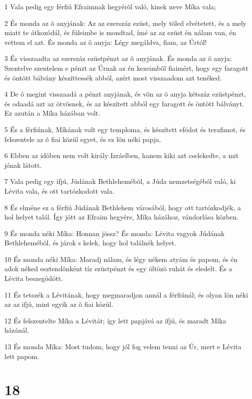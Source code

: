\par 1 Vala pedig egy férfiú Efraimnak hegyérõl való, kinek neve Míka vala;
\par 2 És monda az õ anyjának: Az az ezerszáz ezüst, mely tõled elvétetett, és a mely miatt te átkozódál, és füleimbe is mondtad, ímé az az ezüst én nálam van, én vettem el azt. És monda az õ anyja: Légy megáldva, fiam, az Úrtól!
\par 3 És visszaadta az ezerszáz ezüstpénzt az õ anyjának. És monda az õ anyja: Szentelve szentelem e pénzt az Úrnak az én kezeimbõl fiaimért, hogy egy faragott és öntött bálvány készíttessék abból, azért most visszaadom azt tenéked.
\par 4 De õ megint visszaadá a pénzt anyjának, és võn az õ anyja kétszáz ezüstpénzt, és odaadá azt az ötvösnek, és az készített abból egy faragott és öntött bálványt. Ez azután a Míka házában volt.
\par 5 És a férfiúnak, Míkának volt egy temploma, és készített efódot és terafimot, és felszentele  az õ fiai közül egyet, és ez lõn néki papja.
\par 6 Ebben az idõben nem volt király Izráelben, hanem kiki azt cselekedte, a mit jónak látott.
\par 7 Vala pedig egy ifjú, Júdának Bethlehemébõl, a Júda nemzetségéból való, ki Lévita vala, és ott tartózkodott vala.
\par 8 És elméne ez a férfiú Júdának Bethlehem városából, hogy ott tartózkodjék, a hol helyet talál. Így jött az Efraim hegyére, Míka házához, vándorlása közben.
\par 9 És monda néki Míka: Honnan jössz? És monda: Lévita vagyok Júdának Bethlehemébõl, és járok s kelek, hogy hol találnék helyet.
\par 10 És monda néki Míka: Maradj nálam, és légy nékem atyám és papom, és én adok néked esztendõnként tíz ezüstpénzt és egy öltözõ ruhát és eledelt. És a Lévita beszegõdött.
\par 11 És tetszék a Lévitának, hogy megmaradjon annál a férfiúnál; és olyan lõn néki az az ifjú, mint egyik az õ fiai közül.
\par 12 És felszentelte Míka a Lévitát; így lett papjává az ifjú, és maradt Míka házánál.
\par 13 És monda Míka: Most tudom, hogy jól fog velem tenni az Úr, mert e Lévita lett papom.

\chapter{18}

